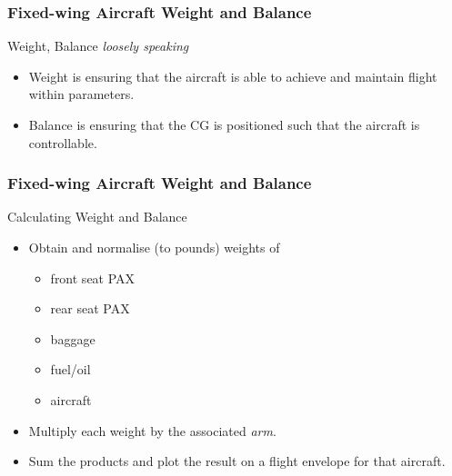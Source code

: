 \begin{frame}
\frametitle{Fixed-wing Aircraft Weight and Balance}
\begin{block}{Weight, Balance \emph{\tiny{loosely speaking}}}
\begin{itemize}
\item Weight is ensuring that the aircraft is able to achieve and maintain flight within parameters.
\item Balance is ensuring that the CG is positioned such that the aircraft is controllable.
\end{itemize}
\end{block}
\end{frame}

\begin{frame}
\frametitle{Fixed-wing Aircraft Weight and Balance}
\begin{block}{Calculating Weight and Balance}
\begin{itemize}
\item<1-> Obtain and normalise (to pounds) weights of
  \begin{itemize}
  \item \tiny{front seat PAX}
  \item \tiny{rear seat PAX}
  \item \tiny{baggage}
  \item \tiny{fuel/oil}
  \item \tiny{aircraft}
  \end{itemize}
\item<2-> Multiply each weight by the associated \emph{arm}.
\item<3-> Sum the products and plot the result on a flight envelope for that aircraft.
\end{itemize}
\end{block}
\end{frame}

